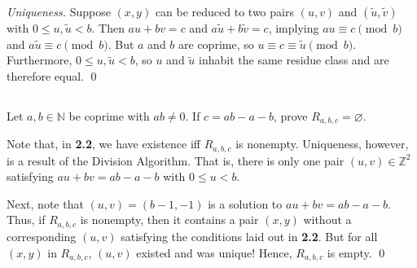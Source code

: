 \documentclass{article}
\newcommand{\N}{\mathbb{N}}
\newcommand{\Z}{\mathbb{Z}}
\begin{document}
  \textit{Uniqueness.}
  Suppose $(x,y)$ can be reduced to two pairs $(u,v)$ and $(\tilde{u},
  \tilde{v})$ with $0\leq u,\tilde{u}<b$. Then $au+bv=c$ and $a\tilde{u}+b
  \tilde{v}=c$, implying $au\equiv c\pmod{b}$ and $a\tilde{u}\equiv c\pmod{b}$.
  But $a$ and $b$ are coprime, so $u\equiv c\equiv\tilde{u}\pmod{b}$.
  Furthermore, $0\leq u,\tilde{u}<b$, so $u$ and $\tilde{u}$ inhabit the same
  residue class and are therefore equal.
  \qed

\subsection{} %
  Let $a,b\in\N$ be coprime with $ab\ne0$. If $c=ab-a-b$, prove $R_{a,b,c}=
  \varnothing$.

  Note that, in \textbf{2.2}, we have existence iff $R_{a,b,c}$ is nonempty.
  Uniqueness, however, is a result of the Division Algorithm. That is, there is
  only one pair $(u,v)\in\Z^2$ satisfying $au+bv=ab-a-b$ with $0\leq u<b$.

  Next, note that $(u,v)=(b-1,-1)$ is a solution to $au+bv=ab-a-b$. Thus, if
  $R_{a,b,c}$ is nonempty, then it contains a pair $(x,y)$ without a
  corresponding $(u,v)$ satisfying the conditions laid out in \textbf{2.2}. But
  for all $(x,y)$ in $R_{a,b,c}$, $(u,v)$ existed and was unique! Hence,
  $R_{a,b,c}$ is empty.
  \qed
\end{document}
